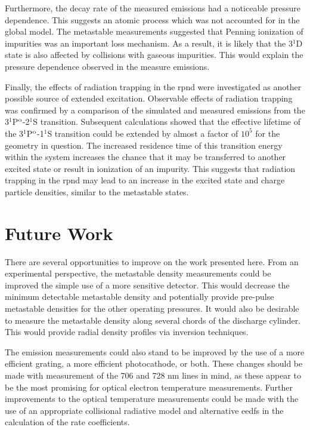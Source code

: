 Furthermore, the decay rate of the measured emissions had a noticeable pressure
dependence. This suggests an atomic process which was not accounted for in the
global model. The metastable measurements suggested that Penning ionization of
impurities was an important loss mechanism. As a result, it is likely that the
3$^1$D state is also affected by collisions with gaseous impurities. This would
explain the pressure dependence observed in the measure emissions.

Finally, the effects of radiation trapping in the \acs{rpnd} were investigated
as another possible source of extended excitation. Observable effects of
radiation trapping was confirmed by a comparison of the simulated and measured
emissions from the 3$^1$P$^\mathrm{o}$-2$^1$S transition. Subsequent calculations
showed that the effective lifetime of the 3$^1$P$^\mathrm{o}$-1$^1$S transition could
be extended by almost a factor of $10^5$ for the geometry in question. The
increased residence time of this transition energy within the system increases
the chance that it may be transferred to another excited state or result in
ionization of an impurity. This suggests that radiation trapping in the
\acs{rpnd} may lead to an increase in the excited state and charge particle
densities, similar to the metastable states.

\section{Future Work}

There are several opportunities to improve on the work presented here. From an
experimental perspective, the metastable density measurements could be improved
the simple use of a more sensitive detector. This would decrease the minimum
detectable metastable density and potentially provide pre-pulse metastable
densities for the other operating pressures. It would also be desirable to
measure the metastable density along several chords of the discharge cylinder.
This would provide radial density profiles via inversion techniques.

The emission measurements could also stand to be improved by the use of a more
efficient grating, a more efficient photocathode, or both. These changes should
be made with measurement of the 706 and 728 nm lines in mind, as these appear to
be the most promising for optical electron temperature measurements. Further
improvements to the optical temperature measurements could be made with the use
of an appropriate collisional radiative model and alternative \acs{eedf}s in the
calculation of the rate coefficients.

